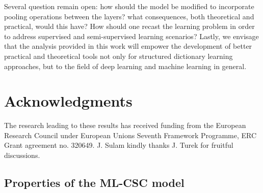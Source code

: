 \documentclass[10pt,journal]{IEEEtran}
\theoremstyle{plain}
\theoremstyle{definition}
\begin{document}
Several question remain open: how should the model be modified to incorporate pooling operations between the layers? what consequences, both theoretical and practical, would this have? How should one recast the learning problem in order to address supervised and semi-supervised learning scenarios? Lastly, we envisage that the analysis provided in this work will empower the development of better practical and theoretical tools not only for structured dictionary learning approaches, but to the field of deep learning and machine learning in general.

\section{Acknowledgments}
The research leading to these results has received funding from the European Research Council under European Unions Seventh Framework Programme, ERC Grant agreement no. 320649. J. Sulam kindly thanks J. Turek for fruitful discussions.








\appendix 

\newtheorem{innercustomgeneric}{\customgenericname}
\providecommand{\customgenericname}{}
\newcommand{\newcustomtheorem}[2]{%
	\newenvironment{#1}[1]
	{%
		\renewcommand\customgenericname{#2}%
		\renewcommand\theinnercustomgeneric{##1}%
		\innercustomgeneric
	}
	{\endinnercustomgeneric}
}

\newcustomtheorem{customlemma}{Lemma}
\newcustomtheorem{customdef}{Definition}

\subsection{Properties of the ML-CSC model}
\label{app:MLCSCisCSC}
\end{document}
